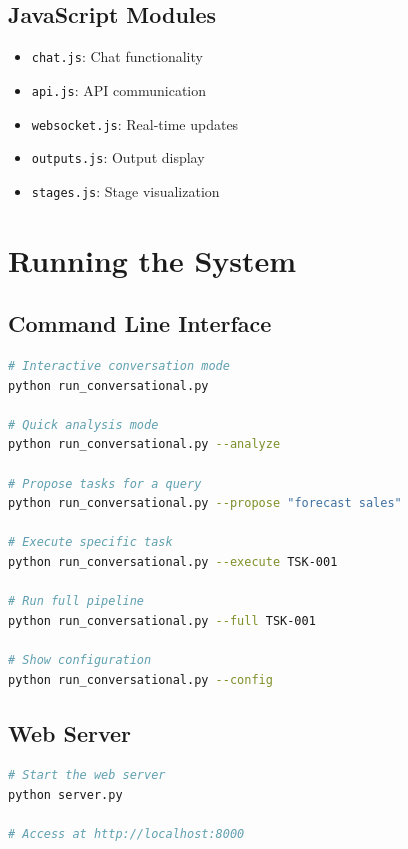 \documentclass[12pt,a4paper]{report}
\begin{document}
\section{JavaScript Modules}
\begin{itemize}
    \item \texttt{chat.js}: Chat functionality
    \item \texttt{api.js}: API communication
    \item \texttt{websocket.js}: Real-time updates
    \item \texttt{outputs.js}: Output display
    \item \texttt{stages.js}: Stage visualization
\end{itemize}

\chapter{Running the System}

\section{Command Line Interface}
\begin{lstlisting}[language=bash]
# Interactive conversation mode
python run_conversational.py

# Quick analysis mode
python run_conversational.py --analyze

# Propose tasks for a query
python run_conversational.py --propose "forecast sales"

# Execute specific task
python run_conversational.py --execute TSK-001

# Run full pipeline
python run_conversational.py --full TSK-001

# Show configuration
python run_conversational.py --config
\end{lstlisting}

\section{Web Server}
\begin{lstlisting}[language=bash]
# Start the web server
python server.py

# Access at http://localhost:8000
\end{lstlisting}
\end{document}
